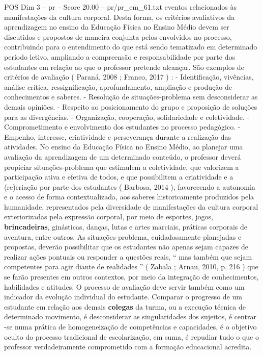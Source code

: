 \begin{textsample}{POS Dim 3 – pr – Score 20.00 – pr/pr\_em\_61.txt}
eventos relacionados às manifestações da cultura corporal.
Desta forma, os critérios avaliativos da aprendizagem no ensino da Educação Física no Ensino Médio devem ser discutidos e propostos de maneira conjunta pelos envolvidos no processo, contribuindo para o entendimento do que está sendo tematizado em determinado período letivo, ampliando a compreensão e responsabilidade por parte dos estudantes em relação ao que o professor pretende alcançar.
São exemplos de critérios de avaliação ( Paraná, 2008 ; Franco, 2017 ) : - Identificação, vivências, análise crítica, ressignificação, aprofundamento, ampliação e produção de conhecimentos e saberes. - Resolução de situações-problema sem desconsiderar as demais opiniões. - Respeito ao posicionamento do grupo e proposição de soluções para as divergências. - Organização, cooperação, solidariedade e coletividade. - Comprometimento e envolvimento dos estudantes no processo pedagógico. - Empenho, interesse, criatividade e perseverança durante a realização das atividades.
No ensino da Educação Física no Ensino Médio, ao planejar uma avaliação da aprendizagem de um determinado conteúdo, o professor deverá propiciar situações-problema que estimulem a coletividade, que valorizem a participação ativa e efetiva de todos, e que possibilitem a criatividade e a (re)criação por parte dos estudantes ( Barbosa, 2014 ), favorecendo a autonomia e o acesso de forma contextualizada, aos saberes historicamente produzidos pela humanidade, representados pela diversidade de manifestações da cultura corporal exteriorizadas pela expressão corporal, por meio de esportes, jogos, \textbf{brincadeiras}, ginásticas, danças, lutas e artes marciais, práticas corporais de aventura, entre outros.
As situações-problema, cuidadosamente planejadas e propostas, deverão possibilitar que os estudantes não apenas sejam capazes de realizar ações pontuais ou responder a questões reais, “ mas também que sejam competentes para agir diante de realidades ” ( Zabala ; Arnau, 2010, p. 216 ) que se farão presentes em outros contextos, por meio da integração de conhecimentos, habilidades e atitudes.
O processo de avaliação deve servir também como um indicador da evolução individual do estudante.
Comparar o progresso de um estudante em relação aos demais \textbf{colegas} da turma, ou a execução técnica de determinado movimento, é desconsiderar as singularidades dos sujeitos, é centrar -se numa prática de homogeneização de competências e capacidades, é o objetivo oculto do processo tradicional de escolarização, em suma, é repudiar tudo o que o professor verdadeiramente comprometido com a formação educacional acredita.

\end{textsample}
